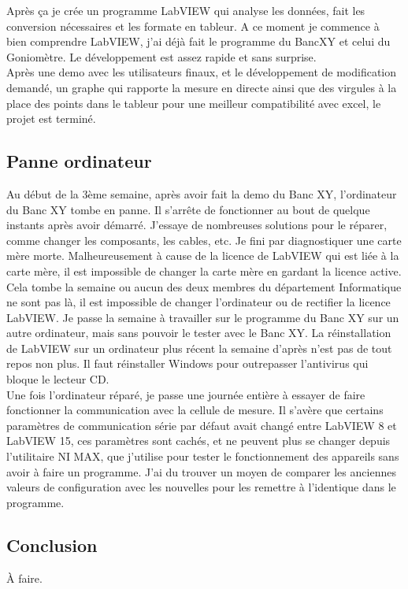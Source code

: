 \documentclass[12pt]{article}
\begin{document}
  

Après ça je crée un programme LabVIEW qui analyse les données, fait les conversion nécessaires et les formate en tableur.
A ce moment je commence à bien comprendre LabVIEW, j'ai déjà fait le programme du BancXY et celui du Goniomètre.
Le développement est assez rapide et sans surprise.\\
Après une demo avec les utilisateurs finaux, et le développement de modification demandé, un graphe qui rapporte la mesure en directe ainsi que des virgules à la place des points dans le tableur pour une meilleur compatibilité avec excel, le projet est terminé.

\newpage
\subsection{ Panne ordinateur }

Au début de la 3ème semaine, après avoir fait la demo du Banc XY, l'ordinateur du Banc XY tombe en panne.
Il s'arrête de fonctionner au bout de quelque instants après avoir démarré.
J'essaye de nombreuses solutions pour le réparer, comme changer les composants, les cables, etc.
Je fini par diagnostiquer une carte mère morte.
Malheureusement à cause de la licence de LabVIEW qui est liée à la carte mère, il est impossible de changer la carte mère en gardant la licence active.\\
Cela tombe la semaine ou aucun des deux membres du département Informatique ne sont pas là, il est impossible de changer l'ordinateur ou de rectifier la licence LabVIEW.
Je passe la semaine à travailler sur le programme du Banc XY sur un autre ordinateur, mais sans pouvoir le tester avec le Banc XY.
La réinstallation de LabVIEW sur un ordinateur plus récent la semaine d'après n'est pas de tout repos non plus.
Il faut réinstaller Windows pour outrepasser l'antivirus qui bloque le lecteur CD.\\
Une fois l'ordinateur réparé, je passe une journée entière à essayer de faire fonctionner la communication avec la cellule de mesure.
Il s'avère que certains paramètres de communication série par défaut avait changé entre LabVIEW 8 et LabVIEW 15, ces paramètres sont cachés, et ne peuvent plus se changer depuis l'utilitaire NI MAX, que j'utilise pour tester le fonctionnement des appareils sans avoir à faire un programme.
J'ai du trouver un moyen de comparer les anciennes valeurs de configuration avec les nouvelles pour les remettre à l'identique dans le programme.


\newpage
\subsection{ Conclusion }

À faire.



\newpage

\printglossaries
\end{document}
